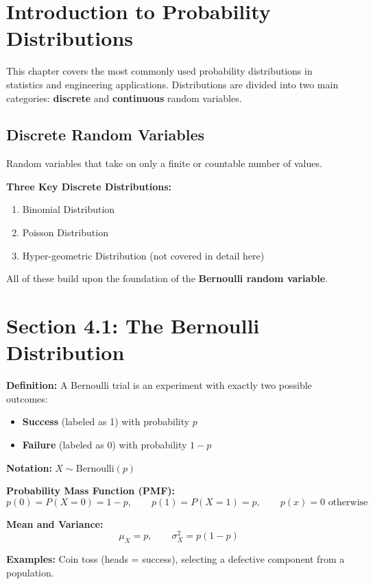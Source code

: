 \documentclass[11pt]{article}
\begin{document}
\section*{Introduction to Probability Distributions}
This chapter covers the most commonly used probability distributions in statistics and engineering applications. Distributions are divided into two main categories: \textbf{discrete} and \textbf{continuous} random variables.

\subsection*{Discrete Random Variables}
Random variables that take on only a finite or countable number of values.

\textbf{Three Key Discrete Distributions:}
\begin{enumerate}[nosep]
    \item Binomial Distribution
    \item Poisson Distribution
    \item Hyper-geometric Distribution (not covered in detail here)
\end{enumerate}
All of these build upon the foundation of the \textbf{Bernoulli random variable}.

\section*{Section 4.1: The Bernoulli Distribution}
\textbf{Definition:} A Bernoulli trial is an experiment with exactly two possible outcomes:
\begin{itemize}[nosep]
    \item \textbf{Success} (labeled as 1) with probability \(p\)
    \item \textbf{Failure} (labeled as 0) with probability \(1-p\)
\end{itemize}

\textbf{Notation:} \(X \sim \text{Bernoulli}(p)\)

\textbf{Probability Mass Function (PMF):}
\[
p(0) = P(X=0) = 1-p,\qquad p(1)=P(X=1)=p,\qquad p(x)=0 \text{ otherwise}
\]

\textbf{Mean and Variance:}
\[
\mu_X = p,\qquad \sigma_X^2 = p(1-p)
\]

\textbf{Examples:} Coin toss (heads = success), selecting a defective component from a population.
\end{document}
